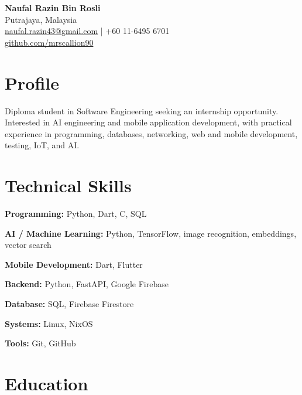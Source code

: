\documentclass[10pt,a4paper]{article}
\begin{document}

\begin{center}
    {\LARGE \textbf{Naufal Razin Bin Rosli}}\\[4pt]
    Putrajaya, Malaysia\\
    \href{mailto:naufal.razin43@gmail.com}{naufal.razin43@gmail.com}
    \quad|\quad
    +60 11-6495 6701\\
    \href{https://github.com/mrscallion90}{github.com/mrscallion90}
\end{center}

\section{Profile}

Diploma student in Software Engineering seeking an internship opportunity.
Interested in AI engineering and mobile application development, with practical
experience in programming, databases, networking, web and mobile development,
testing, IoT, and AI.

\section{Technical Skills}

\textbf{Programming:} Python, Dart, C, SQL

\textbf{AI / Machine Learning:} Python, TensorFlow, image recognition,
embeddings, vector search

\textbf{Mobile Development:} Dart, Flutter

\textbf{Backend:} Python, FastAPI, Google Firebase

\textbf{Database:} SQL, Firebase Firestore

\textbf{Systems:} Linux, NixOS

\textbf{Tools:} Git, GitHub

\section{Education}
\end{document}
